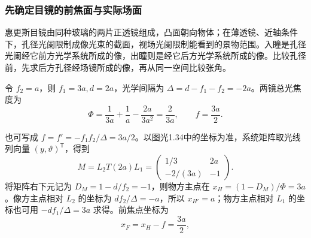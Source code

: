 \documentclass[UTF8,fontset=fandol,a4paper,11pt]{ctexart}
\begin{document}
\subsubsection*{先确定目镜的前焦面与实际场面}
惠更斯目镜由同种玻璃的两片正透镜组成，凸面朝向物体；在薄透镜、近轴条件下，孔径光阑限制成像光束的截面，视场光阑限制能看到的景物范围。入瞳是孔径光阑经它前方光学系统所成的像，出瞳则是经它后方光学系统所成的像。比较孔径前，先求后方孔径经场镜所成的像，再从同一空间比较张角。

令 $f_2=a$，则 $f_1=3a,d=2a$，光学间隔为 $\Delta=d-f_1-f_2=-2a$。两镜总光焦度为
\[
\Phi=\frac1{3a}+\frac1a-\frac{2a}{3a^2}
=\frac2{3a},\qquad f=\frac{3a}{2}.
\]

也可写成 $f=f'=-f_1f_2/\Delta=3a/2$。以图光1.34中的坐标为准，系统矩阵取光线列向量 $(y,\vartheta)^{\mathsf T}$，得到
\[
M=L_2T(2a)L_1=
\begin{pmatrix}1/3&2a\\-2/(3a)&-1\end{pmatrix}.
\]
将矩阵右下元记为 $D_M=1-d/f_2=-1$，则物方主点在 $x_H=(1-D_M)/\Phi=3a$。像方主点相对 $L_2$ 的坐标为 $d f_2/\Delta=-a$，所以 $x_{H'}=a$；物方主点相对 $L_1$ 的坐标也可用 $-df_1/\Delta=3a$ 求得。前焦点坐标为
\[
x_F=x_H-f=\frac{3a}{2},
\]
\end{document}
